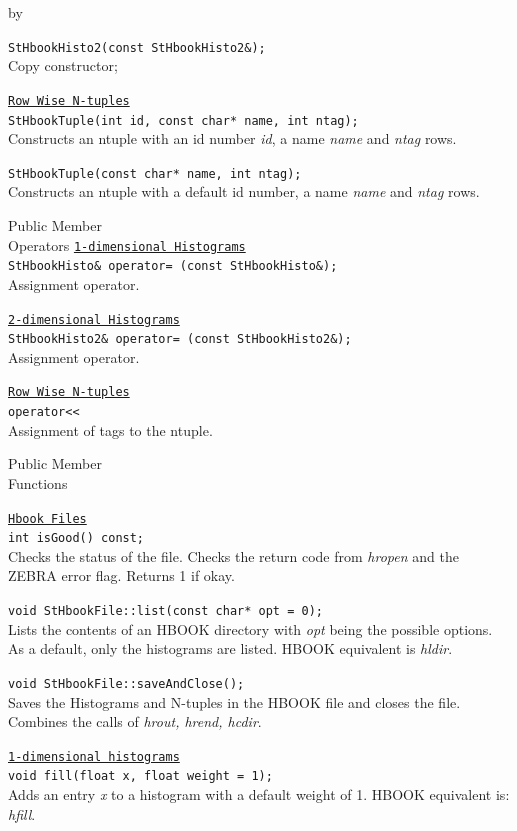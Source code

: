 \documentclass[twoside]{article}
\newcommand{\comp}[1]{\texttt{#1}}%
\newcommand{\entrylabel}[1]{\mbox{\textbf{{#1}}}\hfil}%
\newenvironment{entry}
{\begin{list}{}%
    {\renewcommand{\makelabel}{\entrylabel}%
     \setlength{\labelwidth}{90pt}%
     \setlength{\leftmargin}{\labelwidth}
     \advance\leftmargin by \labelsep%
      }%
    }%
  {\end{list}}
\newcommand{\Entrylabel}[1]%
{\raisebox{0pt}[1ex][0pt]{\makebox[\labelwidth][l]%
    {\parbox[t]{\labelwidth}{\hspace{0pt}\textbf{{#1}}}}}}
\newenvironment{Entry}%
{\renewcommand{\entrylabel}{\Entrylabel}\begin{entry}}%
  {\end{entry}}
\begin{document}
\begin{description}
\begin{Entry}
  \verb+StHbookHisto2(const StHbookHisto2&);+\\
  Copy constructor;
  
  \comp{\underline{Row Wise N-tuples}} \\
  \verb+StHbookTuple(int id, const char* name, int ntag);+\\
  Constructs an ntuple with an id number {\em id}, a name {\em name}
  and {\em ntag} rows.
  
  \verb+StHbookTuple(const char* name, int ntag);+\\
  Constructs an ntuple with a default id number, a name {\em name}
  and {\em ntag} rows.
  
\item[Public Member\\ Operators]
  \comp{\underline{1-dimensional Histograms}} \\
  \verb+StHbookHisto& operator= (const StHbookHisto&);+\\
  Assignment operator.

  \comp{\underline{2-dimensional Histograms}} \\
  \verb+StHbookHisto2& operator= (const StHbookHisto2&);+\\
  Assignment operator.

  \comp{\underline{Row Wise N-tuples}} \\
  \verb+operator<<+\\
  Assignment of tags to the ntuple.
  
\item[Public Member\\ Functions]

  \comp{\underline{Hbook Files}} \\
  \verb+int isGood() const;+\\
  Checks the status of the file.  Checks the return
  code from {\em hropen} and the ZEBRA error flag.
  Returns 1 if okay.
  
  \verb+void StHbookFile::list(const char* opt = 0);+\\
  Lists the contents of an HBOOK directory with {\em opt}
  being the possible options.  As a default, only the histograms
  are listed.  HBOOK equivalent is {\em hldir}.
  
  \verb+void StHbookFile::saveAndClose();+\\
  Saves the Histograms and N-tuples in the HBOOK file
  and closes the file.  Combines the calls of
  {\em hrout,   hrend,  hcdir}.
  
  \comp{\underline{1-dimensional histograms}}\\
  \verb+void fill(float x, float weight = 1);+\\
  Adds an entry {\em x} to a histogram with a default weight of 1.
  HBOOK equivalent is: {\em hfill}.
  

\end{Entry}
\end{description}
\end{document}
